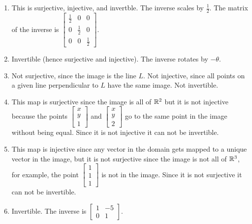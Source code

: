 \begin{SaveQuestion}
    \begin{enumerate}
        \item This is surjective, injective, and invertble. The inverse scales by $\frac{1}{2}.$ The matrix of the inverse is
			$\begin{bmatrix} \frac{1}{2} & 0 & 0 \\ 0 & \frac{1}{2} & 0 \\ 0& 0& \frac{1}{2}\end{bmatrix}$.
        \item Invertible (hence surjective and injective). The inverse rotates by $-\theta$.
        \item Not surjective, since the image is the line $L$. Not injective, since all points on a given line perpendicular to $L$  have the same image. Not invertible.
        \item This map is surjective since the image is all of $\mathbb{R}^2$ but it is not injective because the points $\begin{bmatrix}
            x \\ y \\ 1
        \end{bmatrix}$ and $\begin{bmatrix}
            x \\ y \\ 2
        \end{bmatrix}$ go to the same point in the image without being equal. Since it is not injective it can not be invertible. 
        \item This map is injective since any vector in the domain gets mapped to a unique vector in the image, but it is not surjective since the image is not all of $\mathbb{R}^3$, for example, the point $\begin{bmatrix}
            1 \\ 1 \\ 1
        \end{bmatrix}$ is not in the image. Since it is not surjective it can not be invertible.
        \item Invertible. The inverse is  $\begin{bmatrix} 1 & -5 \\ 0 & 1 \end{bmatrix}.$
    \end{enumerate}
\end{SaveQuestion}


